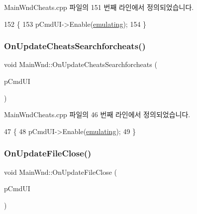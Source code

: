Main\+Wnd\+Cheats.\+cpp 파일의 151 번째 라인에서 정의되었습니다.


\begin{DoxyCode}
152 \{
153   pCmdUI->Enable(\mbox{\hyperlink{_main_wnd_cheats_8cpp_af9cc36078b1b311753963297ae7f2a74}{emulating}});
154 \}
\end{DoxyCode}
\mbox{\label{class_main_wnd_aa8d542452917aad684d8762790c74e96}} 
\subsubsection{\texorpdfstring{On\+Update\+Cheats\+Searchforcheats()}{OnUpdateCheatsSearchforcheats()}}
{\footnotesize\ttfamily void Main\+Wnd\+::\+On\+Update\+Cheats\+Searchforcheats (\begin{DoxyParamCaption}\item[{C\+Cmd\+UI $\ast$}]{p\+Cmd\+UI }\end{DoxyParamCaption})\hspace{0.3cm}{\ttfamily [protected]}}



Main\+Wnd\+Cheats.\+cpp 파일의 46 번째 라인에서 정의되었습니다.


\begin{DoxyCode}
47 \{
48   pCmdUI->Enable(\mbox{\hyperlink{_main_wnd_cheats_8cpp_af9cc36078b1b311753963297ae7f2a74}{emulating}});
49 \}
\end{DoxyCode}
\mbox{\label{class_main_wnd_a2a6f2246f0bced548c0267e1869896f4}} 
\subsubsection{\texorpdfstring{On\+Update\+File\+Close()}{OnUpdateFileClose()}}
{\footnotesize\ttfamily void Main\+Wnd\+::\+On\+Update\+File\+Close (\begin{DoxyParamCaption}\item[{C\+Cmd\+UI $\ast$}]{p\+Cmd\+UI }\end{DoxyParamCaption})\hspace{0.3cm}{\ttfamily [protected]}}



